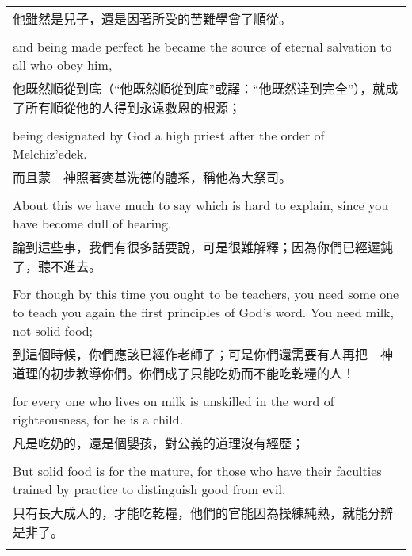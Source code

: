 \begin{tabularx}{\textwidth}{p{}}
他雖然是兒子，還是因著所受的苦難學會了順從。 \\ \\
and being made perfect he became the source of eternal salvation to all who obey him, \\
他既然順從到底（“他既然順從到底”或譯：“他既然達到完全”），就成了所有順從他的人得到永遠救恩的根源； \\ \\
being designated by God a high priest after the order of Melchiz'edek. \\
而且蒙　神照著麥基洗德的體系，稱他為大祭司。 \\ \\
About this we have much to say which is hard to explain, since you have become dull of hearing. \\
論到這些事，我們有很多話要說，可是很難解釋；因為你們已經遲鈍了，聽不進去。 \\ \\
For though by this time you ought to be teachers, you need some one to teach you again the first principles of God's word. You need milk, not solid food; \\
到這個時候，你們應該已經作老師了；可是你們還需要有人再把　神道理的初步教導你們。你們成了只能吃奶而不能吃乾糧的人！ \\ \\
for every one who lives on milk is unskilled in the word of righteousness, for he is a child. \\
凡是吃奶的，還是個嬰孩，對公義的道理沒有經歷； \\ \\
But solid food is for the mature, for those who have their faculties trained by practice to distinguish good from evil. \\
只有長大成人的，才能吃乾糧，他們的官能因為操練純熟，就能分辨是非了。 \\ \\

\hline
\end{tabularx}

\newpage

